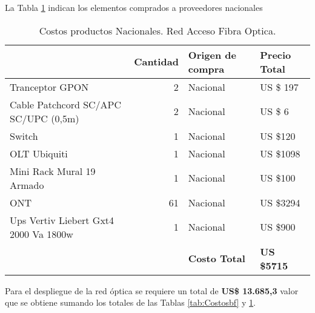 






La Tabla \ref{tab:Costosbc} indican los elementos comprados a proveedores nacionales





\begin{table}[H]
  \centering
    \begin{tabular}{|r|r|l|l|}
    \hline
    \rowcolor[HTML]{C5D9F1} \multicolumn{1}{|l|}{\textbf{Descripción }} & \multicolumn{1}{l|}{\textbf{Cantidad}} & \textbf{Origen de compra} & \textbf{Precio Total} \bigstrut\\
    \hline
    \multicolumn{1}{|l|}{Tranceptor GPON} & 2     & Nacional & US \$ 197 \bigstrut\\
    \hline
    \multicolumn{1}{|l|}{Cable Patchcord SC/APC SC/UPC (0,5m)} & 2     & Nacional & US \$ 6 \bigstrut\\
    \hline
    \multicolumn{1}{|l|}{Switch} & 1     & Nacional & US \$120 \bigstrut\\
    \hline
    \multicolumn{1}{|l|}{OLT Ubiquiti} & 1     & Nacional & US \$1098 \bigstrut\\
    \hline
    \multicolumn{1}{|l|}{Mini Rack Mural 19 Armado} & 1     & Nacional & US \$100 \bigstrut\\
    \hline
    \multicolumn{1}{|l|}{ONT} & 61    & Nacional & US \$3294 \bigstrut\\
    \hline
    \multicolumn{1}{|l|}{Ups Vertiv Liebert Gxt4 2000 Va 1800w} & 1     & Nacional & US \$900 \bigstrut\\
    \hline
    \rowcolor[HTML]{C5D9F1}       &       & \textbf{Costo Total} & \textbf{US \$5715} \bigstrut\\
    \hline
    \end{tabular}%
  \caption{Costos productos Nacionales. Red Acceso Fibra Optica.}
  \label{tab:Costosbc}%
\end{table}%





Para el despliegue de la red óptica se requiere un total de  \textbf{US\$ 13.685,3} valor que se obtiene sumando los totales de las Tablas \ref{tab:Costosbf} y \ref{tab:Costosbc}.




\newpage






